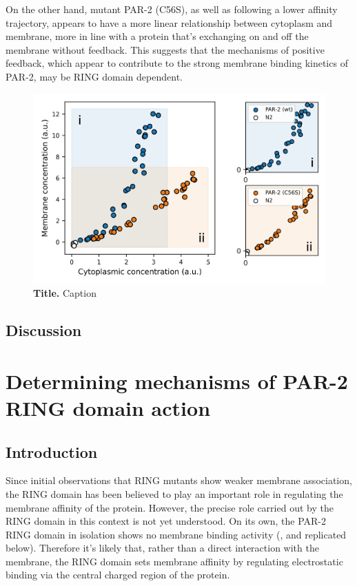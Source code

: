 \documentclass[12pt]{"article"}
\newcommand{\mycaption}[2]{\caption[#1]{\textbf{#1.} #2}}
\begin{document}
On the other hand, mutant PAR-2 (C56S), as well as following a lower affinity trajectory, appears to have a more linear relationship between cytoplasm and membrane, more in line with a protein that's exchanging on and off the membrane without feedback. This suggests that the mechanisms of positive feedback, which appear to contribute to the strong membrane binding kinetics of PAR-2, may be RING domain dependent.

\begin{figure}[!h]
\includegraphics[scale=1]{rundown_vs_c56s}
\setlength{\abovecaptionskip}{20pt}
\centering
\mycaption{Title}{Caption}
\label{fig:rundown_vs_c56s}
\end{figure}

\clearpage
\subsection{Discussion}

\clearpage
\section{Determining mechanisms of PAR-2 RING domain action}

\subsection{Introduction}


Since initial observations that RING mutants show weaker membrane association, the RING domain has been believed to play an important role in regulating the membrane affinity of the protein. However, the precise role carried out by the RING domain in this context is not yet understood. On its own, the PAR-2 RING domain in isolation shows no membrane binding activity (\textcite{Hao2006}, and replicated below). Therefore it's likely that, rather than a direct interaction with the membrane, the RING domain sets membrane affinity by regulating electrostatic binding via the central charged region of the protein.\\
\end{document}
